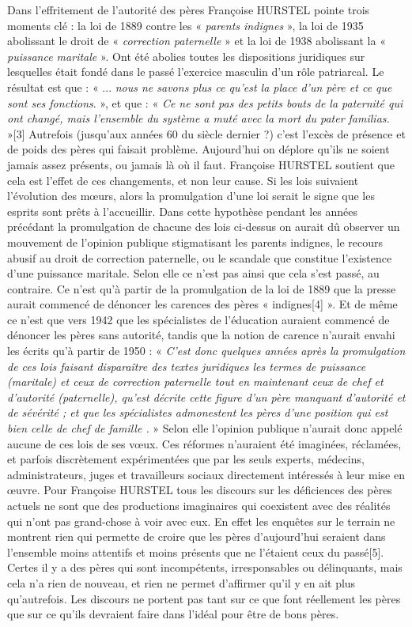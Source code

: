  Dans l'effritement de l'autorité des pères Françoise HURSTEL pointe trois moments clé : la loi de 1889 contre les « \emph{parents indignes} », la loi de 1935 abolissant le droit de « \emph{correction paternelle} » et la loi de 1938 abolissant la « \emph{puissance maritale} ». Ont été abolies toutes les dispositions juridiques sur lesquelles était fondé dans le passé l'exercice masculin d'un rôle patriarcal. Le résultat est que : « ... \emph{nous ne savons plus ce qu'est la place d'un père et ce que sont ses fonctions}. », et que : « \emph{Ce ne sont pas des petits bouts de la paternité qui ont changé, mais l'ensemble du système a muté avec la mort du pater familias.} »[3]
 Autrefois (jusqu'aux années 60 du siècle dernier ?) c'est l'excès de présence et de poids des pères qui faisait problème. Aujourd'hui on déplore qu'ils ne soient jamais assez présents, ou jamais là où il faut. Françoise HURSTEL soutient que cela est l'effet de ces changements, et non leur cause. Si les lois suivaient l'évolution des mœurs, alors la promulgation d'une loi serait le signe que les esprits sont prêts à l'accueillir. Dans cette hypothèse pendant les années précédant la promulgation de chacune des lois ci-dessus on aurait dû observer un mouvement de l'opinion publique stigmatisant les parents indignes, le recours abusif au droit de correction paternelle, ou le scandale que constitue l'existence d'une puissance maritale. Selon elle ce n'est pas ainsi que cela s'est passé, au contraire. Ce n'est qu'à partir de la promulgation de la loi de 1889 que la presse aurait commencé de dénoncer les carences des pères « indignes[4] ».
 Et de même ce n'est que vers 1942 que les spécialistes de l'éducation auraient commencé de dénoncer les pères sans autorité, tandis que la notion de carence n'aurait envahi les écrits qu'à partir de 1950 : « \emph{C'est donc quelques années après la promulgation de ces lois faisant disparaître des textes juridiques les termes de puissance (maritale) et ceux de correction paternelle tout en maintenant ceux de chef et d'autorité (paternelle), qu'est décrite cette figure d'un père manquant d'autorité et de sévérité ; et que les spécialistes admonestent les pères d'une position qui est bien celle de chef de famille .} » 
 Selon elle l'opinion publique n'aurait donc appelé aucune de ces lois de ses vœux. Ces réformes n'auraient été imaginées, réclamées, et parfois discrètement expérimentées que par les seuls experts, médecins, administrateurs, juges et travailleurs sociaux directement intéressés à leur mise en œuvre. Pour Françoise HURSTEL tous les discours sur les déficiences des pères actuels ne sont que des productions imaginaires qui coexistent avec des réalités qui n'ont pas grand-chose à voir avec eux. En effet les enquêtes sur le terrain ne montrent rien qui permette de croire que les pères d'aujourd'hui seraient dans l'ensemble moins attentifs et moins présents que ne l'étaient ceux du passé[5]. Certes il y a des pères qui sont incompétents, irresponsables ou délinquants, mais cela n'a rien de nouveau, et rien ne permet d'affirmer qu'il y en ait plus qu'autrefois. Les discours ne portent pas tant sur ce que font réellement les pères que sur ce qu'ils devraient faire dans l'idéal pour être de bons pères. 
